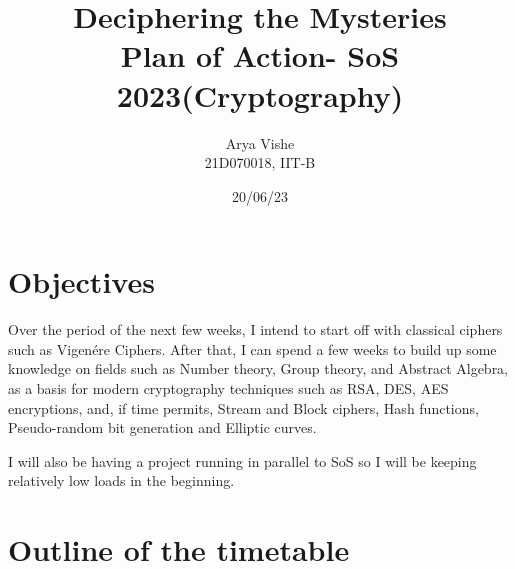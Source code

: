 \documentclass[11pt]{article} %
\title{\huge{Deciphering the Mysteries} \\ \normalsize Plan of Action- SoS 2023(Cryptography)}
\author{Arya Vishe \\21D070018, IIT-B} %
\affil{Mentor- Nilabha Saha}
\date{20/06/23} %
\begin{document}
\maketitle

\section{Objectives}

Over the period of the next few weeks, I intend to start off with classical ciphers such as Vigen\'{e}re Ciphers. After that, I can spend a few weeks to build up some knowledge on fields such as Number theory, Group theory, and Abstract Algebra, as a basis for modern cryptography techniques such as RSA, DES, AES encryptions, and, if time permits, Stream and Block ciphers, Hash functions, Pseudo-random bit generation and Elliptic curves.  \par
I will also be having a project running in parallel to SoS so I will be keeping relatively low loads in the beginning.

\section{Outline of the timetable}

\captionsetup{labelformat=empty}
\end{document}
